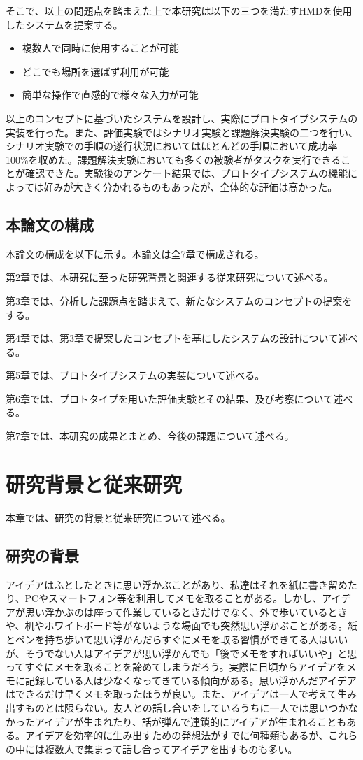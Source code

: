 \documentclass[11pt,a4j, titlepage]{jarticle} %
\begin{document}
そこで、以上の問題点を踏まえた上で本研究は以下の三つを満たすHMDを使用したシステムを提案する。
\begin{itemize}
 \item 複数人で同時に使用することが可能
 \item どこでも場所を選ばず利用が可能
 \item 簡単な操作で直感的で様々な入力が可能
\end{itemize}

以上のコンセプトに基づいたシステムを設計し、実際にプロトタイプシステムの実装を行った。また、評価実験ではシナリオ実験と課題解決実験の二つを行い、シナリオ実験での手順の遂行状況においてはほとんどの手順において成功率100\%を収めた。課題解決実験においても多くの被験者がタスクを実行できることが確認できた。実験後のアンケート結果では、プロトタイプシステムの機能によっては好みが大きく分かれるものもあったが、全体的な評価は高かった。

\subsection{本論文の構成}
本論文の構成を以下に示す。本論文は全7章で構成される。

第2章では、本研究に至った研究背景と関連する従来研究について述べる。

第3章では、分析した課題点を踏まえて、新たなシステムのコンセプトの提案をする。

第4章では、第3章で提案したコンセプトを基にしたシステムの設計について述べる。

第5章では、プロトタイプシステムの実装について述べる。

第6章では、プロトタイプを用いた評価実験とその結果、及び考察について述べる。

第7章では、本研究の成果とまとめ、今後の課題について述べる。

\newpage
\section{研究背景と従来研究}
本章では、研究の背景と従来研究について述べる。

\subsection{研究の背景}
アイデアはふとしたときに思い浮かぶことがあり、私達はそれを紙に書き留めたり、PCやスマートフォン等を利用してメモを取ることがある。しかし、アイデアが思い浮かぶのは座って作業しているときだけでなく、外で歩いているときや、机やホワイトボード等がないような場面でも突然思い浮かぶことがある。紙とペンを持ち歩いて思い浮かんだらすぐにメモを取る習慣ができてる人はいいが、そうでない人はアイデアが思い浮かんでも「後でメモをすればいいや」と思ってすぐにメモを取ることを諦めてしまうだろう。実際に日頃からアイデアをメモに記録している人は少なくなってきている傾向がある\cite{memo}。思い浮かんだアイデアはできるだけ早くメモを取ったほうが良い。また、アイデアは一人で考えて生み出すものとは限らない。友人との話し合いをしているうちに一人では思いつかなかったアイデアが生まれたり、話が弾んで連鎖的にアイデアが生まれることもある。アイデアを効率的に生み出すための発想法がすでに何種類もあるが、これらの中には複数人で集まって話し合ってアイデアを出すものも多い\cite{hassouhou}。
\end{document}
